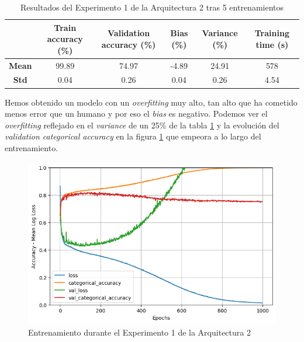 \documentclass{article}
\begin{document}
			\begin{table}[!h]
				\begin{center}
					\begin{tabular}{ c | c | c | c | c | c |}
						\ & \textbf{Train accuracy (\%)} & \textbf{Validation accuracy (\%)} & \textbf{Bias (\%)} & \textbf{Variance (\%)} & \textbf{Training time (s)} \\ \hline
						\textbf{Mean} & 99.89 & 74.97 & -4.89 & 24.91 & 578\\ \hline
						\textbf{Std} & 0.04 & 0.26 & 0.04 & 0.26 & 4.54 \\ \hline
					\end{tabular}
					\caption{Resultados del Experimento 1 de la Arquitectura 2 tras 5 entrenamientos}
					\label{tab:res-d-a2-e1}
				\end{center}
			\end{table}
			
			Hemos obtenido un modelo con un \textit{overfitting} muy alto, tan alto que ha cometido menos error que un humano y por eso el \textit{bias} es negativo. Podemos ver el \textit{overfitting} reflejado en el \textit{variance} de un 25\% de la tabla \ref{tab:res-d-a2-e1} y la evoluci\'on del \textit{validation categorical accuracy} en la figura \ref{d-tr-a2-e1} que empeora a lo largo del entrenamiento.
			
			\begin{figure}[!h]
				\begin{center}
					\includegraphics[scale=0.5]{d-tr-a2-e1.png}		
					\caption{Entrenamiento durante el Experimento 1 de la Arquitectura 2}	
					\label{d-tr-a2-e1}
				\end{center}
			\end{figure}
			
\end{document}
